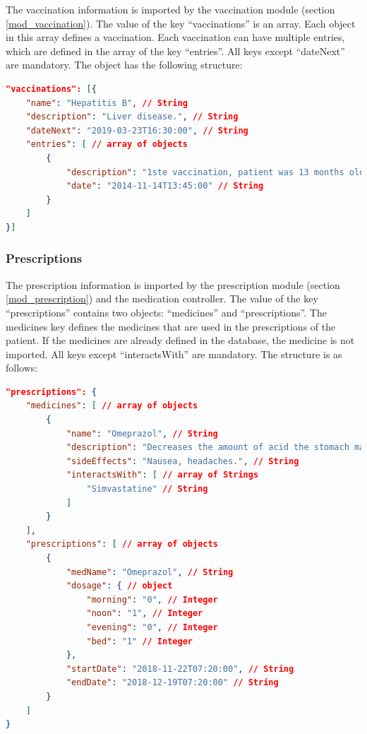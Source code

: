     The vaccination information is imported by the vaccination module (section
    \ref{mod_vaccination}). The value of the key ``vaccinations'' is an array. Each object in this array defines a vaccination. Each vaccination can have multiple entries, which are defined in the array of the key ``entries''. All keys except ``dateNext'' are mandatory. The object has the following structure:

\begin{lstlisting}[language=json,firstnumber=1]
"vaccinations": [{
    "name": "Hepatitis B", // String
    "description": "Liver disease.", // String
    "dateNext": "2019-03-23T16:30:00", // String
    "entries": [ // array of objects
        {
            "description": "1ste vaccination, patient was 13 months old.", // String
            "date": "2014-11-14T13:45:00" // String
        }
    ]
}]
\end{lstlisting}

    \subsubsection{Prescriptions}

    The prescription information is imported by the prescription module (section
    \ref{mod_prescription}) and the medication controller. The value of the key ``prescriptions'' contains two objects: ``medicines'' and ``prescriptions''. The medicines key defines the medicines that are used in the prescriptions of the patient. If the medicines are already defined in the database, the medicine is not imported. All keys except ``interactsWith'' are mandatory. The structure is as follows:

\begin{lstlisting}[language=json,firstnumber=1]
"prescriptions": {
    "medicines": [ // array of objects
        {
            "name": "Omeprazol", // String
            "description": "Decreases the amount of acid the stomach makes.", // String
            "sideEffects": "Nausea, headaches.", // String
            "interactsWith": [ // array of Strings
                "Simvastatine" // String
            ]
        }
    ],
    "prescriptions": [ // array of objects
        {
            "medName": "Omeprazol", // String
            "dosage": { // object
                "morning": "0", // Integer
                "noon": "1", // Integer
                "evening": "0", // Integer
                "bed": "1" // Integer
            },
            "startDate": "2018-11-22T07:20:00", // String
            "endDate": "2018-12-19T07:20:00" // String
        }
    ]
}
\end{lstlisting}

